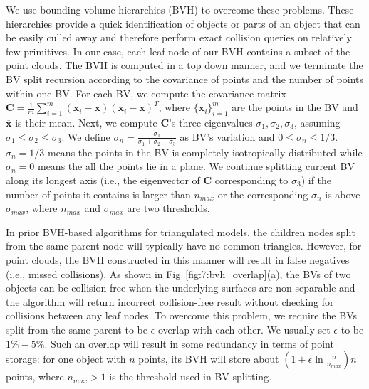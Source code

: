 We use bounding volume hierarchies (BVH) to overcome these problems. These hierarchies provide a quick identification
of objects or parts of an object that can be easily culled away and therefore perform exact collision queries on relatively
few primitives.
In our case, each leaf node of our BVH contains a subset of the point clouds. The BVH is computed in a top down manner, and we terminate the BV split recursion according to
the covariance of points and the number of points within one BV. For each BV, we compute the covariance matrix $\mathbf C = \frac{1}{m} \sum_{i=1}^{m} (\mathbf x_i - \overline{\mathbf x})(\mathbf x_i - \overline{\mathbf x})^T$, where $\{\mathbf x_i\}_{i=1}^m$ are the points in the BV and $\overline{\mathbf x}$ is their mean.
Next, we compute $\mathbf C$'s three eigenvalues $\sigma_1, \sigma_2, \sigma_3$, assuming $\sigma_1 \leq \sigma_2 \leq \sigma_3$. We define $\sigma_n = \frac{\sigma_1}{\sigma_1 + \sigma_2 + \sigma_3}$ as BV's variation and $0 \leq \sigma_n \leq 1/3$. $\sigma_n = 1/3$ means the points in the BV is completely isotropically distributed while $\sigma_n = 0$ means the all the points lie in a plane. We continue splitting current BV along its longest axis (i.e., the eigenvector of $\mathbf C$ corresponding to $\sigma_3$) if the number of points it contains is larger than $n_{max}$ or the corresponding $\sigma_n$ is above $\sigma_{max}$, where $n_{max}$ and $\sigma_{max}$
are two thresholds.

In prior BVH-based algorithms for triangulated models, the children nodes split from the same parent node will typically have no common triangles.
However, for point clouds, the BVH constructed in this manner will result in false negatives (i.e., missed collisions). As shown in Fig~\ref{fig:7:bvh_overlap}(a), the BVs
of two objects can be collision-free when the underlying surfaces are non-separable and the algorithm will return incorrect collision-free result
without checking for collisions between any leaf nodes. To overcome this problem,  we require the BVs split from the same parent to be $\epsilon$-overlap with
each other. We usually set $\epsilon$ to be $1\%- 5\%$. Such  an overlap will result in some redundancy in terms of point storage: for one object with $n$ points, its
BVH will store about $(1+\epsilon \ln \frac{n}{n_{max}} ) n$ points, where $n_{max} > 1$ is the threshold used in BV splitting.


